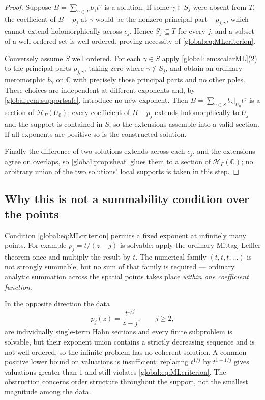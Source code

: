 \documentclass[11pt,letterpaper]{article}
\theoremstyle{definition}
\theoremstyle{remark}
\newcommand{\C}{\mathbb C}
\newcommand{\HH}{\mathscr H_\Gamma}
\numberwithin{equation}{section}
\begin{document}
\begin{proof}
Suppose $B=\sum_{\gamma\in T}b_\gamma t^\gamma$ is a solution. If some $\gamma\in S_j$ were absent from $T$, the coefficient of $B-p_j$ at $\gamma$ would be the nonzero principal part $-p_{j,\gamma}$, which cannot extend holomorphically across $c_j$. Hence $S_j\subseteq T$ for every $j$, and a subset of a well-ordered set is well ordered, proving necessity of \eqref{global:eq:MLcriterion}.

Conversely assume $S$ well ordered. For each $\gamma\in S$ apply \cref{global:lem:scalarML}(2) to the principal parts $p_{j,\gamma}$, taking zero where $\gamma\notin S_j$, and obtain an ordinary meromorphic $b_\gamma$ on $\C$ with precisely those principal parts and no other poles. These choices are independent at different exponents and, by \cref{global:rem:supportsafe}, introduce no new exponent. Then $B=\sum_{\gamma\in S}b_\gamma|_{U_0}t^\gamma$ is a section of $\HH(U_0)$; every coefficient of $B-p_j$ extends holomorphically to $U_j$ and the support is contained in $S$, so the extensions assemble into a valid section. If all exponents are positive so is the constructed solution.

Finally the difference of two solutions extends across each $c_j$, and the extensions agree on overlaps, so \cref{global:prop:sheaf} glues them to a section of $\HH(\C)$; no arbitrary union of the two solutions' local supports is taken in this step.
\end{proof}

\subsection{Why this is not a summability condition over the points}

Condition \eqref{global:eq:MLcriterion} permits a fixed exponent at infinitely many points. For example $p_j=t/(z-j)$ is solvable: apply the ordinary Mittag--Leffler theorem once and multiply the result by $t$. The numerical family $(t,t,t,\dots)$ is not strongly summable, but no sum of that family is required --- ordinary analytic summation across the spatial points takes place \emph{within one coefficient function}.

In the opposite direction the data
\begin{equation}\label{global:eq:descendingPP}
  p_j(z)=\frac{t^{1/j}}{z-j},\qquad j\ge2,
\end{equation}
are individually single-term Hahn sections and every finite subproblem is solvable, but their exponent union contains a strictly decreasing sequence and is not well ordered, so the infinite problem has no coherent solution. A common positive lower bound on valuations is insufficient: replacing $t^{1/j}$ by $t^{1+1/j}$ gives valuations greater than $1$ and still violates \eqref{global:eq:MLcriterion}. The obstruction concerns order structure throughout the support, not the smallest magnitude among the data.
\end{document}
